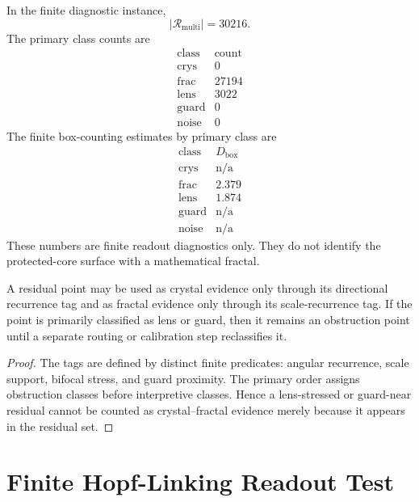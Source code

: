 \begin{remark}
In the finite diagnostic instance,
\[
    |\mathcal R_{\mathrm{multi}}|=30216.
\]
The primary class counts are
\[
\begin{array}{c|r}
\text{class} & \text{count}\\
\hline
\mathrm{crys} & 0\\
\mathrm{frac} & 27194\\
\mathrm{lens} & 3022\\
\mathrm{guard} & 0\\
\mathrm{noise} & 0
\end{array}
\]
The finite box-counting estimates by primary class are
\[
\begin{array}{c|c}
\text{class} & D_{\mathrm{box}}\\
\hline
\mathrm{crys} & \text{n/a}\\
\mathrm{frac} & 2.379\\
\mathrm{lens} & 1.874\\
\mathrm{guard} & \text{n/a}\\
\mathrm{noise} & \text{n/a}
\end{array}
\]
These numbers are finite readout diagnostics only.  They do not identify the
protected-core surface with a mathematical fractal.
\end{remark}

\begin{theorem}
A residual point may be used as crystal evidence only through its directional
recurrence tag and as fractal evidence only through its scale-recurrence tag.
If the point is primarily classified as lens or guard, then it remains an
obstruction point until a separate routing or calibration step reclassifies it.
\end{theorem}

\begin{proof}
The tags are defined by distinct finite predicates: angular recurrence,
scale support, bifocal stress, and guard proximity.  The primary order assigns
obstruction classes before interpretive classes.  Hence a lens-stressed or
guard-near residual cannot be counted as crystal--fractal evidence merely
because it appears in the residual set.
\end{proof}



\section{Finite Hopf-Linking Readout Test}
\label{sec:finite-hopf-linking-readout-test}

